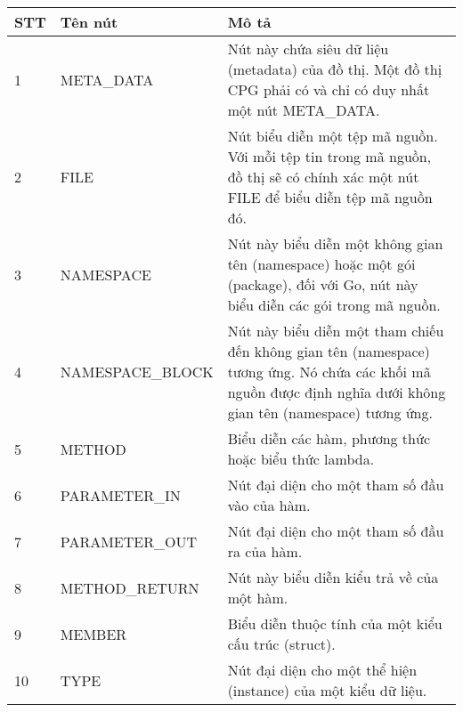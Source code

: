 \footnotesize
\begin{longtable}{| p{} | p{} | p{} |}
\hline
\textbf{STT} & \textbf{Tên nút} & \textbf{Mô tả} \\ \hline
1   & META\_DATA         & Nút này chứa siêu dữ liệu (metadata) của đồ thị. Một đồ thị CPG phải có và chỉ có duy nhất một nút META\_DATA.                                                   \\ \hline
2   & FILE              & Nút biểu diễn một tệp mã nguồn. Với mỗi tệp tin trong mã nguồn, đồ thị sẽ có chính xác một nút FILE để biểu diễn tệp mã nguồn đó.                               \\ \hline
3   & NAMESPACE         & Nút này biểu diễn một không gian tên (namespace) hoặc một gói (package), đối với Go, nút này biểu diễn các gói trong mã nguồn.                                  \\ \hline
4   & NAMESPACE\_BLOCK   & Nút này biểu diễn một tham chiếu đến không gian tên (namespace) tương ứng. Nó chứa các khối mã nguồn được định nghĩa dưới không gian tên (namespace) tương ứng. \\ \hline
5   & METHOD            & Biểu diễn các hàm, phương thức hoặc biểu thức lambda.                                                                                                           \\ \hline
6   & PARAMETER\_IN      & Nút đại diện cho một tham số đầu vào của hàm.                                                                                                                   \\ \hline
7   & PARAMETER\_OUT     & Nút đại diện cho một tham số đầu ra của hàm.                                                                                                                    \\ \hline
8   & METHOD\_RETURN     & Nút này biểu diễn kiểu trả về của một hàm.                                                                                                                      \\ \hline
9   & MEMBER            & Biểu diễn thuộc tính của một kiểu cấu trúc (struct).                                                                                                            \\ \hline
10  & TYPE              & Nút đại diện cho một thể hiện (instance) của một kiểu dữ liệu.                                                                                                  \\ \hline

\end{longtable}

